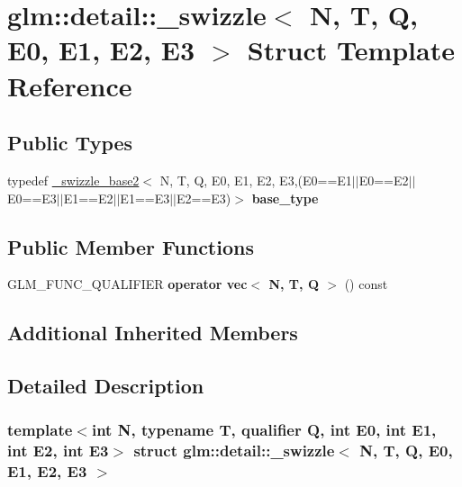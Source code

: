 \hypertarget{structglm_1_1detail_1_1__swizzle}{}\section{glm\+:\+:detail\+:\+:\+\_\+swizzle$<$ N, T, Q, E0, E1, E2, E3 $>$ Struct Template Reference}
\label{structglm_1_1detail_1_1__swizzle}
\subsection*{Public Types}
\begin{DoxyCompactItemize}
\item 
\mbox{\label{structglm_1_1detail_1_1__swizzle_ac055459bca5651cfea9466ffd3a0daeb}} 
typedef \hyperlink{structglm_1_1detail_1_1__swizzle__base2}{\+\_\+swizzle\+\_\+base2}$<$ N, T, Q, E0, E1, E2, E3,(E0==E1$\vert$$\vert$E0==E2$\vert$$\vert$E0==E3$\vert$$\vert$E1==E2$\vert$$\vert$E1==E3$\vert$$\vert$E2==E3)$>$ {\bfseries base\+\_\+type}
\end{DoxyCompactItemize}
\subsection*{Public Member Functions}
\begin{DoxyCompactItemize}
\item 
\mbox{\label{structglm_1_1detail_1_1__swizzle_ab4237b43cd0b0b081668ba6ab1072903}} 
G\+L\+M\+\_\+\+F\+U\+N\+C\+\_\+\+Q\+U\+A\+L\+I\+F\+I\+ER {\bfseries operator vec$<$ N, T, Q $>$} () const
\end{DoxyCompactItemize}
\subsection*{Additional Inherited Members}


\subsection{Detailed Description}
\subsubsection*{template$<$int N, typename T, qualifier Q, int E0, int E1, int E2, int E3$>$\newline
struct glm\+::detail\+::\+\_\+swizzle$<$ N, T, Q, E0, E1, E2, E3 $>$}



